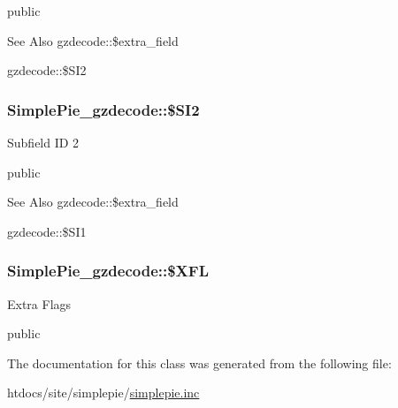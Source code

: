 public \begin{DoxySeeAlso}{See Also}
gzdecode\-::\$extra\-\_\-field 

gzdecode\-::\$\-S\-I2 
\end{DoxySeeAlso}
\hypertarget{class_simple_pie__gzdecode_ae1c54f3ff7b41e7598b9744b84f689f6}{
\subsubsection[{\$\-S\-I2}]{\setlength{\rightskip}{0pt plus 5cm}Simple\-Pie\-\_\-gzdecode\-::\$\-S\-I2}}\label{class_simple_pie__gzdecode_ae1c54f3ff7b41e7598b9744b84f689f6}
Subfield I\-D 2

public \begin{DoxySeeAlso}{See Also}
gzdecode\-::\$extra\-\_\-field 

gzdecode\-::\$\-S\-I1 
\end{DoxySeeAlso}
\hypertarget{class_simple_pie__gzdecode_a174accf279fb3c1f721045db5fdbf06f}{
\subsubsection[{\$\-X\-F\-L}]{\setlength{\rightskip}{0pt plus 5cm}Simple\-Pie\-\_\-gzdecode\-::\$\-X\-F\-L}}\label{class_simple_pie__gzdecode_a174accf279fb3c1f721045db5fdbf06f}
Extra Flags

public 

The documentation for this class was generated from the following file\-:\begin{DoxyCompactItemize}
\item 
htdocs/site/simplepie/\hyperlink{simplepie_8inc}{simplepie.\-inc}\end{DoxyCompactItemize}
